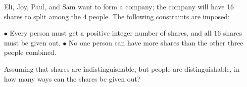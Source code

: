Eli, Joy, Paul, and Sam want to form a company; the company will have 16 shares to split among the $4$ people. The following constraints are imposed:

$\bullet$ Every person must get a positive integer number of shares, and all $16$ shares must be given out.
$\bullet$ No one person can have more shares than the other three people combined.

Assuming that shares are indistinguishable, but people are distinguishable, in how many ways can the shares be given out?